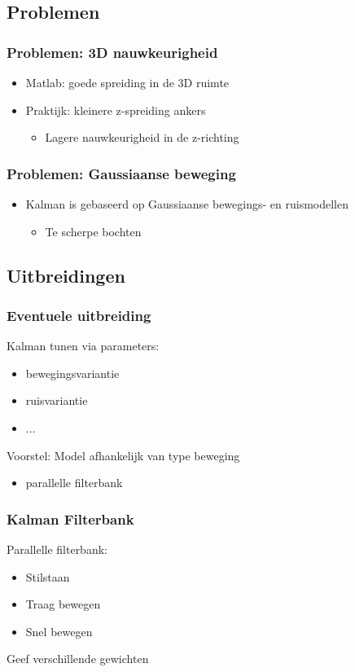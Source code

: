 \documentclass{beamer}
\begin{document}
\subsection{Problemen}
\begin{frame}
\frametitle{Problemen: 3D nauwkeurigheid}
\begin{itemize}
\item Matlab: goede spreiding in de 3D ruimte
\item Praktijk: kleinere z-spreiding ankers
\begin{itemize}
\item Lagere nauwkeurigheid in de z-richting
\end{itemize}
\end{itemize}
\end{frame}
\begin{frame}
\frametitle{Problemen: Gaussiaanse beweging}
\begin{itemize}
\item Kalman is gebaseerd op Gaussiaanse bewegings- en ruismodellen
\begin{itemize}
\item Te scherpe bochten 
\end{itemize}
\end{itemize}
\end{frame}
\subsection{Uitbreidingen}
\begin{frame}
\frametitle{Eventuele uitbreiding}
Kalman tunen via parameters:
\begin{itemize}
\item bewegingsvariantie
\item ruisvariantie
\item ...
\end{itemize}

Voorstel:
Model afhankelijk van type beweging\\
\begin{itemize}
\item parallelle filterbank
\end{itemize}
\end{frame}

\begin{frame}
\frametitle{Kalman Filterbank}
Parallelle filterbank:
\begin{itemize}

\item Stilstaan
\item Traag bewegen
\item Snel bewegen
\end{itemize}

Geef verschillende gewichten

\end{frame}
\end{document}
